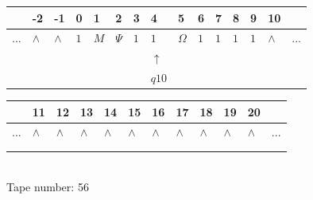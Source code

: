 \documentclass[11pt]{article}
\begin{document}
\begin{table}[H]
\centering
\begin{tabular}{lllllllllllllll}
 & -2 & -1 & 0 & 1 & 2 & 3 & 4 & 5 & 6 & 7 & 8 & 9 & 10 & \\
\hline
$...$ & \multicolumn{1}{|l|}{$\wedge$} & \multicolumn{1}{|l|}{$\wedge$} & \multicolumn{1}{|l|}{$1$} & \multicolumn{1}{|l|}{$M$} & \multicolumn{1}{|l|}{$\Psi$} & \multicolumn{1}{|l|}{$1$} & \multicolumn{1}{|l|}{$1$} & \multicolumn{1}{|l|}{$\Omega$} & \multicolumn{1}{|l|}{$1$} & \multicolumn{1}{|l|}{$1$} & \multicolumn{1}{|l|}{$1$} & \multicolumn{1}{|l|}{$1$} & \multicolumn{1}{|l|}{$\wedge$} & $...$\\
\hline
&  &  &  &  &  &  & $\uparrow$ &  &  &  &  &  &  &  \\
&  &  &  &  &  &  & $ q10 $ &  &  &  &  &  &  &  \\
\end{tabular}
\begin{tabular}{llllllllllll}
 & 11 & 12 & 13 & 14 & 15 & 16 & 17 & 18 & 19 & 20 & \\
\hline
$...$ & \multicolumn{1}{|l|}{$\wedge$} & \multicolumn{1}{|l|}{$\wedge$} & \multicolumn{1}{|l|}{$\wedge$} & \multicolumn{1}{|l|}{$\wedge$} & \multicolumn{1}{|l|}{$\wedge$} & \multicolumn{1}{|l|}{$\wedge$} & \multicolumn{1}{|l|}{$\wedge$} & \multicolumn{1}{|l|}{$\wedge$} & \multicolumn{1}{|l|}{$\wedge$} & \multicolumn{1}{|l|}{$\wedge$} & $...$\\
\hline
&  &  &  &  &  &  &  &  &  &  &  \\
&  &  &  &  &  &  &  &  &  &  &  \\
\end{tabular}
\\
Tape number: 56
\noindent\makebox[\linewidth]{\hdashrule{\textwidth}{1pt}{1pt}}\end{table}
\end{document}
